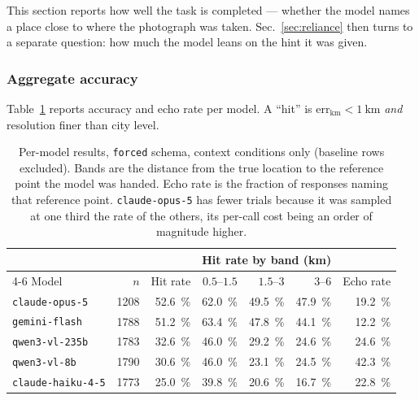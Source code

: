 \documentclass[10pt,a4paper]{article}
\newcommand{\errkm}{\ensuremath{\mathrm{err}_{\mathrm{km}}}}
\begin{document}
This section reports how well the task is completed --- whether the model names
a place close to where the photograph was taken. Sec.~\ref{sec:reliance} then
turns to a separate question: how much the model leans on the hint it was given.

\subsubsection{Aggregate accuracy}
\label{sec:aggregate}

Table~\ref{tab:models} reports accuracy and echo rate per model. A ``hit'' is
$\errkm<\SI{1}{\kilo\metre}$ \emph{and} resolution finer than city level.

\begin{table}[!htbp]
\centering
\caption{Per-model results, \texttt{forced} schema, context conditions only
(baseline rows excluded). Bands are the distance from the true location to the
reference point the model was handed. Echo rate is the fraction of responses
naming that reference point. \texttt{claude-opus-5} has fewer trials because it
was sampled at one third the rate of the others, its per-call cost being an
order of magnitude higher.}
\label{tab:models}
\begin{tabular}{lrrrrrr}
\toprule
& & & \multicolumn{3}{c}{Hit rate by band (\si{\kilo\metre})} & \\
\cmidrule(lr){4-6}
Model & $n$ & Hit rate & $0.5$--$1.5$ & $1.5$--$3$ & $3$--$6$ & Echo rate \\
\midrule
\texttt{claude-opus-5} & 1208 & \SI{52.6}{\percent} & \SI{62.0}{\percent} & \SI{49.5}{\percent} & \SI{47.9}{\percent} & \SI{19.2}{\percent} \\
\texttt{gemini-flash} & 1788 & \SI{51.2}{\percent} & \SI{63.4}{\percent} & \SI{47.8}{\percent} & \SI{44.1}{\percent} & \SI{12.2}{\percent} \\
\texttt{qwen3-vl-235b} & 1783 & \SI{32.6}{\percent} & \SI{46.0}{\percent} & \SI{29.2}{\percent} & \SI{24.6}{\percent} & \SI{24.6}{\percent} \\
\texttt{qwen3-vl-8b} & 1790 & \SI{30.6}{\percent} & \SI{46.0}{\percent} & \SI{23.1}{\percent} & \SI{24.5}{\percent} & \SI{42.3}{\percent} \\
\texttt{claude-haiku-4-5} & 1773 & \SI{25.0}{\percent} & \SI{39.8}{\percent} & \SI{20.6}{\percent} & \SI{16.7}{\percent} & \SI{22.8}{\percent} \\
\bottomrule
\end{tabular}
\end{table}
\end{document}
